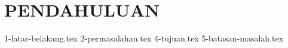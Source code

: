 \chapter{PENDAHULUAN}
\label{chap:pendahuluan}

{1-latar-belakang.tex}
{2-permasalahan.tex}
{4-tujuan.tex}
{5-batasan-masalah.tex}
